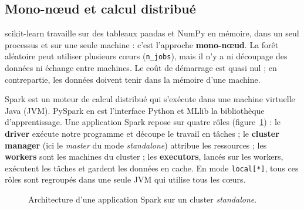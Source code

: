 \documentclass[11pt,a4paper]{article}
\newcommand{\code}[1]{\texttt{#1}}
\begin{document}
\subsection{Mono-nœud et calcul distribué}

scikit-learn travaille sur des tableaux pandas et NumPy en mémoire, dans un seul processus et sur une
seule machine : c'est l'approche \textbf{mono-nœud}. La forêt aléatoire peut utiliser plusieurs cœurs
(\code{n\_jobs}), mais il n'y a ni découpage des données ni échange entre machines. Le coût de
démarrage est quasi nul ; en contrepartie, les données doivent tenir dans la mémoire d'une machine.

Spark est un moteur de calcul distribué qui s'exécute dans une machine virtuelle Java (JVM). PySpark en
est l'interface Python et MLlib la bibliothèque d'apprentissage. Une application Spark repose sur
quatre rôles (figure~\ref{fig:archi}) : le \textbf{driver} exécute notre programme et découpe le
travail en tâches ; le \textbf{cluster manager} (ici le \emph{master} du mode \emph{standalone})
attribue les ressources ; les \textbf{workers} sont les machines du cluster ; les \textbf{executors},
lancés sur les workers, exécutent les tâches et gardent les données en cache. En mode
\code{local[*]}, tous ces rôles sont regroupés dans une seule JVM qui utilise tous les cœurs.

\begin{figure}[H]
\centering
{}
\caption{Architecture d'une application Spark sur un cluster \emph{standalone}.}
\label{fig:archi}
\end{figure}
\end{document}
